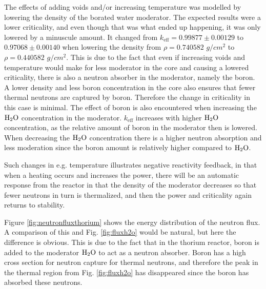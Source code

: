 \documentclass[norsk,a4paper,12pt]{article}
\begin{document}
\begin{multicols}{2}
The effects of adding voids and/or increasing temperature was modelled by lowering the density of the borated water moderator. The expected results were a lower criticality, and even though that was what ended up happening, it was only lowered by a minuscule amount. It changed from $k_{\text{eff}} = 0.99877 \pm 0.00129$ to $0.97068 \pm 0.00140$ when lowering the density from $\rho = 0.740582$ $g/cm^2$ to $\rho = 0.440582$ $g/cm^2$. This is due to the fact that even if increasing voids and temperature would make for less moderator in the core and causing a lowered criticality, there is also a neutron absorber in the moderator, namely the boron. A lower density and less boron concentration in the core also ensures that fewer thermal neutrons are captured by boron. Therefore the change in criticality in this case is minimal. The effect of boron is also encountered when increasing the $\ce{H_2O}$ concentration in the moderator. $k_{\text{eff}}$ increases with higher $\ce{H_2O}$ concentration, as the relative amount of boron in the moderator then is lowered. When decreasing the $\ce{H_2O}$ concentration there is a higher neutron absorption and less moderation since the boron amount is relatively higher compared to $\ce{H_2O}$.

Such changes in e.g. temperature illustrates negative reactivity feedback, in that when a heating occurs and increases the power, there will be an automatic response from the reactor in that the density of the moderator decreases so that fewer neutrons in turn is thermalized, and then the power and criticality again returns to stability.

Figure \ref{fig:neutronfluxthorium} shows the energy distribution of the neutron flux. A comparison of this and Fig. \ref{fig:fluxh2o} would be natural, but here the difference is obvious. This is due to the fact that in the thorium reactor, boron is added to the moderator $\ce{H_{2}O}$ to act as a neutron absorber. Boron has a high cross section for neutron capture for thermal neutrons, and therefore the peak in the thermal region from Fig. \ref{fig:fluxh2o} has disappeared since the boron has absorbed these neutrons.



\end{multicols}
\end{document}
